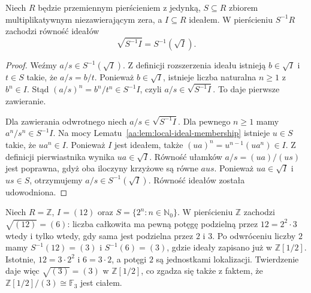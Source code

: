 \begin{twierdzenie}
\label{aa:tw:localization-radical}
Niech $R$ będzie przemiennym pierścieniem z jedynką,
$S\subseteq R$ zbiorem multiplikatywnym
niezawierającym zera, a $I\subseteq R$ ideałem.
W pierścieniu $S^{-1}R$ zachodzi równość ideałów
\[
 \sqrt{S^{-1}I}=S^{-1}(\sqrt I).
\]
\end{twierdzenie}
\begin{proof}
Weźmy $a/s\in S^{-1}(\sqrt I)$.
Z definicji rozszerzenia ideału istnieją
$b\in\sqrt I$ i $t\in S$ takie, że $a/s=b/t$.
Ponieważ $b\in\sqrt I$, istnieje liczba naturalna
$n\ge1$ z $b^n\in I$. Stąd
$(a/s)^n=b^n/t^n\in S^{-1}I$, czyli
$a/s\in\sqrt{S^{-1}I}$. To daje pierwsze zawieranie.

Dla zawierania odwrotnego niech
$a/s\in\sqrt{S^{-1}I}$. Dla pewnego $n\ge1$
mamy $a^n/s^n\in S^{-1}I$.
Na mocy Lematu~\ref{aa:lem:local-ideal-membership}
istnieje $u\in S$ takie, że $ua^n\in I$.
Ponieważ $I$ jest ideałem, także
$(ua)^n=u^{n-1}(ua^n)\in I$.
Z definicji pierwiastnika wynika $ua\in\sqrt I$.
Równość ułamków $a/s=(ua)/(us)$ jest poprawna,
gdyż oba iloczyny krzyżowe są równe $aus$.
Ponieważ $ua\in\sqrt I$ i $us\in S$,
otrzymujemy $a/s\in S^{-1}(\sqrt I)$.
Równość ideałów została udowodniona.
\end{proof}

\begin{przyklad}
\label{aa:prz:localization-radical-example}
Niech $R=\mathbb Z$, $I=(12)$ oraz
$S=\{2^n:n\in\mathbb N_0\}$.
W pierścieniu $\mathbb Z$ zachodzi
$\sqrt{(12)}=(6)$: liczba całkowita ma pewną
potęgę podzielną przez $12=2^2\cdot3$ wtedy
i tylko wtedy, gdy sama jest podzielna przez
$2$ i $3$. Po odwróceniu liczby $2$ mamy
$S^{-1}(12)=(3)$ i $S^{-1}(6)=(3)$,
gdzie ideały zapisano już w $\mathbb Z[1/2]$.
Istotnie, $12=3\cdot 2^2$ i $6=3\cdot2$,
a potęgi $2$ są jednostkami lokalizacji.
Twierdzenie daje więc
$\sqrt{(3)}=(3)$ w $\mathbb Z[1/2]$,
co zgadza się także z faktem, że
$\mathbb Z[1/2]/(3)\cong\mathbb F_3$ jest ciałem.
\end{przyklad}

